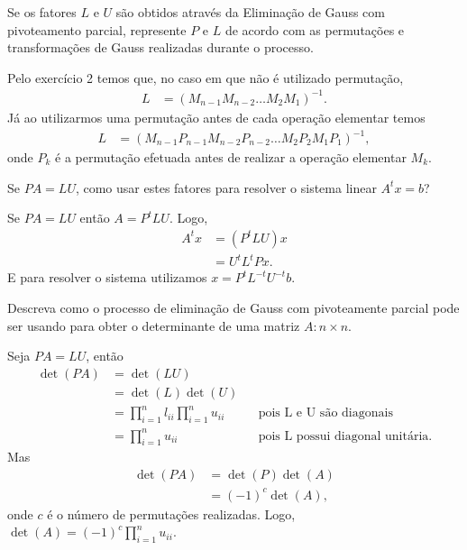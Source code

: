 \begin{questions}
     Se os fatores $L$ e $U$ s\~{a}o obtidos atrav\'{e}s da Elimina\c{c}\~{a}o de Gauss com pivoteamento parcial, represente $P$ e $L$ de acordo com as permuta\c{c}\~{o}es e transforma\c{c}\~{o}es de Gauss realizadas durante o processo.
    \begin{solution}
        Pelo exerc\'{i}cio 2 temos que, no caso em que n\~{a}o \'{e} utilizado permuta\c{c}\~{a}o,
        \begin{align*}
            L &= \left( M_{n - 1} M_{n - 2} \ldots M_2 M_1 \right)^{-1}.
        \end{align*}
        J\'{a} ao utilizarmos uma permuta\c{c}\~{a}o antes de cada opera\c{c}\~{a}o elementar temos
        \begin{align*}
            L &= \left( M_{n - 1} P_{n - 1} M_{n - 2} P_{n - 2} \ldots M_2 P_2 M_1 P_1 \right)^{-1},
        \end{align*}
        onde $P_k$ \'{e} a permuta\c{c}\~{a}o efetuada antes de realizar a opera\c{c}\~{a}o elementar $M_k$.
    \end{solution}

    \question Se $P A = L U$, como usar estes fatores para resolver o sistema linear $A^t x = b$?
    \begin{solution}
        Se $P A = L U$ ent\~{a}o $A = P^t L U$. Logo,
        \begin{align*}
            A^t x &= \left( P^t L U \right) x \\
            &= U^t L^t P x.
        \end{align*}
        E para resolver o sistema utilizamos $x = P^t L^{-t} U^{-t} b$.
    \end{solution}

    \question Descreva como o processo de elimina\c{c}\~{a}o de Gauss com pivoteamente parcial pode ser usando para obter o determinante de uma matriz $A : n \times n$.
    \begin{solution}
        Seja $P A = L U$, ent\~{a}o
        \begin{align*}
            \det(P A) &= \det(L U) \\
            &= \det(L) \det (U) \\
            &= \prod_{i = 1}^n l_{ii} \prod_{i = 1}^n u_{ii} && \text{pois L e U s\~{a}o diagonais} \\
            &= \prod_{i = 1}^n u_{ii} && \text{pois L possui diagonal unit\'{a}ria}.
        \end{align*}
        Mas
        \begin{align*}
            \det(P A) &= \det(P) \det(A) \\
            &= (-1)^{c} \det(A),
        \end{align*}
        onde $c$ \'{e} o n\'{u}mero de permuta\c{c}\~{o}es realizadas. Logo, $\det(A) = (-1)^c \prod_{i = 1}^n u_{ii}$.
    \end{solution}


\end{questions}
